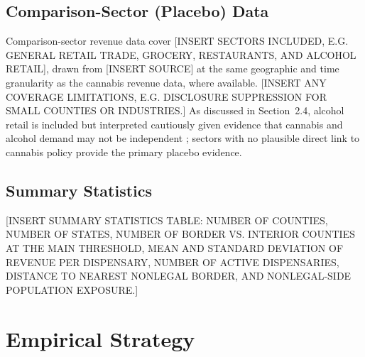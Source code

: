 \documentclass[12pt]{article}
\begin{document}
\subsection{Comparison-Sector (Placebo) Data}
Comparison-sector revenue data cover [INSERT SECTORS INCLUDED, E.G. GENERAL RETAIL TRADE, GROCERY,
RESTAURANTS, AND ALCOHOL RETAIL], drawn from [INSERT SOURCE] at the same geographic and time granularity as
the cannabis revenue data, where available. [INSERT ANY COVERAGE LIMITATIONS, E.G. DISCLOSURE SUPPRESSION
FOR SMALL COUNTIES OR INDUSTRIES.] As discussed in Section~2.4, alcohol retail is included but interpreted
cautiously given evidence that cannabis and alcohol demand may not be independent
\citep{BaggioChongKwon2020}; sectors with no plausible direct link to cannabis policy provide the primary
placebo evidence.

\subsection{Summary Statistics}
[INSERT SUMMARY STATISTICS TABLE: NUMBER OF COUNTIES, NUMBER OF STATES, NUMBER OF BORDER VS. INTERIOR
COUNTIES AT THE MAIN THRESHOLD, MEAN AND STANDARD DEVIATION OF REVENUE PER DISPENSARY, NUMBER OF ACTIVE
DISPENSARIES, DISTANCE TO NEAREST NONLEGAL BORDER, AND NONLEGAL-SIDE POPULATION EXPOSURE.]

\section{Empirical Strategy}
\label{sec:empirical}
\end{document}
